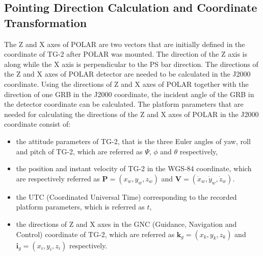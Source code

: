 \documentclass{raa}
\begin{document}
\subsection{Pointing Direction Calculation and Coordinate Transformation} \label{sec:coo_trans}
The Z and X axes of POLAR are two vectors that are initially defined in the coordinate of TG-2 after POLAR was mounted. The direction of the Z axis is along while the X axis is perpendicular to the PS bar direction. The directions of the Z and X axes of POLAR detector are needed to be calculated in the J2000 coordinate. Using the directions of Z and X axes of POLAR together with the direction of one GRB in the J2000 coordinate, the incident angle of the GRB in the detector coordinate can be calculated. The platform parameters that are needed for calculating the directions of the Z and X axes of POLAR in the J2000 coordinate consist of:
\begin{itemize}
\item the attitude parameters of TG-2, that is the three Euler angles of yaw, roll and pitch of TG-2, which are referred as $\Psi$, $\phi$ and $\theta$ respectively,
\item the position and instant velocity of TG-2 in the WGS-84  coordinate, which are respectively referred as $\bm{P} = (x_w, y_w, z_w)$ and $\bm{V} = (\dot{x}_w, \dot{y}_w, \dot{z}_w)$.
\item the UTC (Coordinated Universal Time) corresponding to the recorded platform parameters, which is referred as $t$,
\item the directions of Z and X axes in the GNC (Guidance, Navigation and Control) coordinate of TG-2, which are referred as $\bm{k}_g = (x_{k}, y_{k}, z_{k})$ and $\bm{i}_g = (x_i, y_i, z_i)$ respectively.
\end{itemize}
\end{document}
